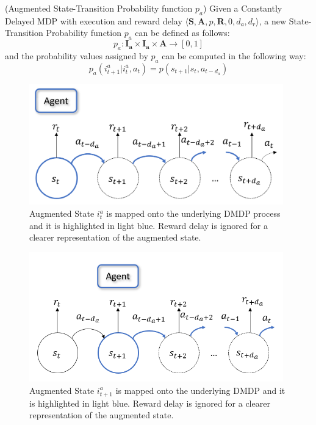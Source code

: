                 \begin{definition}(Augmented State-Transition Probability function $p_a$)
                    \label{def:execaugmenttrans}
                    Given a Constantly Delayed MDP with execution and reward delay $\langle \mathbf{S}, \mathbf{A}, p, \mathbf{R}, 0, d_a, d_r \rangle$,
                    a new State-Transition Probability function $p_a$ can be defined as follows:
                    \[ p_a :  \mathbf{I_{a}} \times \mathbf{I_{a}} \times \mathbf{A} \rightarrow [0, 1]\]
                    and the probability values assigned by $p_a$ can be computed in the following way:
                    \[ p_a \left( i_{t+1}^a | i_t^a , a_t  \right) = p ( s_{t+1} | s_t, a_{t-d_{a}} ) \]
                \end{definition}
                \begin{figure}[t]
                    \centering
                    \includegraphics[width=11cm, keepaspectratio]{images/dmdp/augmented_i_a.png}
                    \caption{Augmented State $i_t^a$ is mapped onto the underlying DMDP process and it is highlighted in light blue. Reward delay is ignored for a clearer representation of the augmented state.}
                    \label{fig:augmented_i_a}
                \end{figure}
                \begin{figure}[t]
                    \centering
                    \includegraphics[width=11cm, keepaspectratio]{images/dmdp/augmented_i_a_next.png}
                    \caption{Augmented State $i_{t+1}^a$ is mapped onto the underlying DMDP and it is highlighted in light blue. Reward delay is ignored for a clearer representation of the augmented state.}
                    \label{fig:augmented_i_a_next}
                \end{figure}
                
